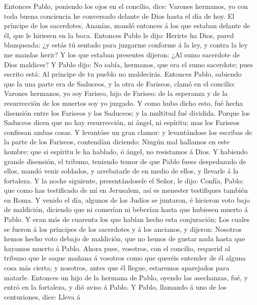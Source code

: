  Entonces Pablo, poniendo los ojos en el concilio, dice:
Varones hermanos, yo con toda buena conciencia he conversado delante de
Dios hasta el día de hoy.  El príncipe de los sacerdotes,
Ananías, mandó entonces á los que estaban delante de él, que le hiriesen
en la boca.  Entonces Pablo le dijo: Herirte ha Dios, pared
blanqueada: ¿y estás tú sentado para juzgarme conforme á la ley, y
contra la ley me mandas herir?  Y los que estaban presentes
dijeron: ¿Al sumo sacerdote de Dios maldices?  Y Pablo dijo:
No sabía, hermanos, que era el sumo sacerdote; pues escrito está: Al
príncipe de tu pueblo no maldecirás.  Entonces Pablo,
sabiendo que la una parte era de Saduceos, y la otra de Fariseos, clamó
en el concilio: Varones hermanos, yo soy Fariseo, hijo de Fariseo: de la
esperanza y de la resurrección de los muertos soy yo juzgado.
 Y como hubo dicho esto, fué hecha disensión entre los
Fariseos y los Saduceos; y la multitud fué dividida.  Porque
los Saduceos dicen que no hay resurrección, ni ángel, ni espíritu; mas
los Fariseos confiesan ambas cosas.  Y levantóse un gran
clamor: y levantándose los escribas de la parte de los Fariseos,
contendían diciendo: Ningún mal hallamos en este hombre; que si espíritu
le ha hablado, ó ángel, no resistamos á Dios.  Y habiendo
grande disensión, el tribuno, teniendo temor de que Pablo fuese
despedazado de ellos, mandó venir soldados, y arrebatarle de en medio de
ellos, y llevarle á la fortaleza.  Y la noche siguiente,
presentándosele el Señor, le dijo: Confía, Pablo; que como has
testificado de mí en Jerusalem, así es menester testifiques también en
Roma.  Y venido el día, algunos de los Judíos se juntaron,
é hicieron voto bajo de maldición, diciendo que ni comerían ni beberían
hasta que hubiesen muerto á Pablo.  Y eran más de cuarenta
los que habían hecho esta conjuración;  Los cuales se
fueron á los príncipes de los sacerdotes y á los ancianos, y dijeron:
Nosotros hemos hecho voto debajo de maldición, que no hemos de gustar
nada hasta que hayamos muerto á Pablo.  Ahora pues,
vosotros, con el concilio, requerid al tribuno que le saque mañana á
vosotros como que queréis entender de él alguna cosa más cierta; y
nosotros, antes que él llegue, estaremos aparejados para matarle.
 Entonces un hijo de la hermana de Pablo, oyendo las
asechanzas, fué, y entró en la fortaleza, y dió aviso á Pablo.
 Y Pablo, llamando á uno de los centuriones, dice: Lleva á
